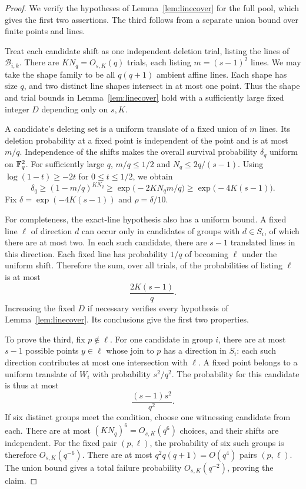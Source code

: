\begin{proof}
We verify the hypotheses of Lemma~\ref{lem:linecover} for the full
pool, which gives the first two assertions.  The third follows from
a separate union bound over finite points and lines.

Treat each candidate shift as one independent deletion trial, listing
the lines of \(\mathcal B_{i,k}\).  There are \(KN_q=O_{s,K}(q)\)
trials, each listing \(m=(s-1)^2\) lines.  We may take the shape
family to be all \(q(q+1)\) ambient affine lines.  Each shape has
size \(q\), and two distinct line shapes intersect in at most one
point.  Thus the shape and trial bounds in
Lemma~\ref{lem:linecover} hold with a sufficiently large fixed
integer \(D\) depending only on \(s,K\).

A candidate's deleting set is a uniform translate of a fixed union
of \(m\) lines.  Its deletion probability at a fixed point is
independent of the point and is at most \(m/q\).  Independence of
the shifts makes the overall survival probability \(\delta_q\)
uniform on \(\mathbb F_q^2\).  For sufficiently large \(q\),
\(m/q\le1/2\) and \(N_q\le2q/(s-1)\).  Using
\(\log(1-t)\ge-2t\) for \(0\le t\le1/2\), we obtain
\[
 \delta_q\ge (1-m/q)^{KN_q}
 \ge \exp\bigl(-2KN_qm/q\bigr)
 \ge \exp\bigl(-4K(s-1)\bigr).
\]
Fix
\(\delta=\exp(-4K(s-1))\) and \(\rho=\delta/10\).

For completeness, the exact-line hypothesis also has a uniform
bound.  A fixed line \(\ell\) of direction \(d\) can occur only
in candidates of groups with \(d\in S_i\), of which there are at
most two.  In each such candidate, there are \(s-1\) translated
lines in this direction.  Each fixed line has probability \(1/q\)
of becoming \(\ell\) under the uniform shift.  Therefore the sum,
over all trials, of the probabilities of listing \(\ell\) is at
most
\begin{equation}
\label{con-exact-line-probability}
 \frac{2K(s-1)}q.
\end{equation}
Increasing the fixed \(D\) if necessary verifies every hypothesis
of Lemma~\ref{lem:linecover}.  Its conclusions give the first two
properties.

To prove the third, fix \(p\notin\ell\).  For one candidate in
group \(i\), there are at most \(s-1\) possible points
\(y\in\ell\) whose join to \(p\) has a direction in \(S_i\):
each such direction contributes at most one intersection with
\(\ell\).  A fixed point belongs to a uniform translate of
\(W_i\) with probability \(s^2/q^2\).  The probability for this
candidate is thus at most
\[
 \frac{(s-1)s^2}{q^2}.
\]
If six distinct groups meet the condition, choose one witnessing
candidate from each.  There are at most \((KN_q)^6=O_{s,K}(q^6)\)
choices, and their shifts are independent.  For the fixed pair
\((p,\ell)\), the probability of six such groups is therefore
\(O_{s,K}(q^{-6})\).  There are at most
\(q^2q(q+1)=O(q^4)\) pairs \((p,\ell)\).  The union bound gives
a total failure probability \(O_{s,K}(q^{-2})\), proving the claim.
\end{proof}

